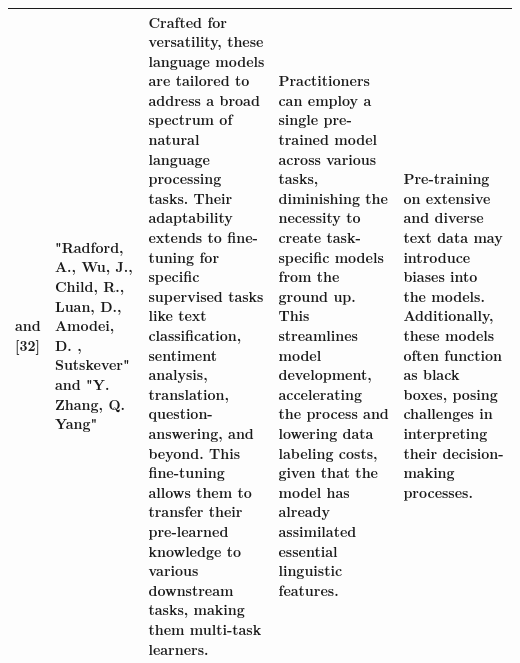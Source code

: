 \documentclass[conference]{IEEEtran}
\begin{document}
\begin{table}
\begin{center}
\begin{tabular}{ |p{1cm}|p{2cm}|p{4cm}|p{4cm}|p{4cm}| }
\hline
[31] and [32] & "Radford, A., Wu, J., Child, R., Luan, D., Amodei, D. , Sutskever" and "Y. Zhang, Q. Yang" & Crafted for versatility, these language models are tailored to address a broad spectrum of natural language processing tasks. Their adaptability extends to fine-tuning for specific supervised tasks like text classification, sentiment analysis, translation, question-answering, and beyond. This fine-tuning allows them to transfer their pre-learned knowledge to various downstream tasks, making them multi-task learners. & Practitioners can employ a single pre-trained model across various tasks, diminishing the necessity to create task-specific models from the ground up. This streamlines model development, accelerating the process and lowering data labeling costs, given that the model has already assimilated essential linguistic features. & Pre-training on extensive and diverse text data may introduce biases into the models. Additionally, these models often function as black boxes, posing challenges in interpreting their decision-making processes. \\
\hline
\end{tabular}
\end{center}
\end{table}
\end{document}
